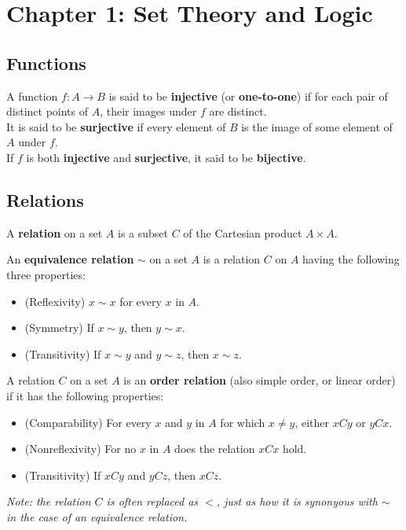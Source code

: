 \section{Chapter 1: Set Theory and Logic}

\setcounter{subsection}{1}
\subsection{Functions}

\begin{definition}
A function $f \colon A \rightarrow B$ is said to be \textbf{injective} (or \textbf{one-to-one}) if for each pair of distinct points of $A$, their images under $f$ are distinct. \\

It is said to be \textbf{surjective} if every element of $B$ is the image of some element of $A$ under $f$. \\

If $f$ is both \textbf{injective} and \textbf{surjective}, it said to be \textbf{bijective}.
\end{definition}

\subsection{Relations}

\begin{definition}[Relation]
A \textbf{relation} on a set $A$ is a subset $C$ of the Cartesian product $A \times A$. 
\end{definition}

\begin{definition}
An \textbf{equivalence relation} $\sim$ on a set $A$ is a relation $C$ on $A$ having the following three properties:
\begin{itemize}
    \item (Reflexivity) $x \sim x$ for every $x$ in $A$.
    \item (Symmetry) If $x \sim y$, then $y \sim x$.
    \item (Transitivity) If $x \sim y$ and $y \sim z$, then $x \sim z$.
\end{itemize}    
\end{definition}

\begin{definition}
    A relation $C$ on a set $A$ is an \textbf{order relation} (also simple order, or linear order) if it has the following properties: 
    \begin{itemize}
        \item (Comparability) For every $x$ and $y$ in $A$ for which $x \neq y$, either $xCy$ or $yCx$.
        \item (Nonreflexivity) For no $x$ in $A$ does the relation $xCx$ hold.
        \item (Transitivity) If $xCy$ and $yCz$, then $xCz$.
    \end{itemize}    
    \textit{Note: the relation $C$ is often replaced as $<$, just as how it is synonyous with $\sim$ in the case of an equivalence relation.}
\end{definition}

